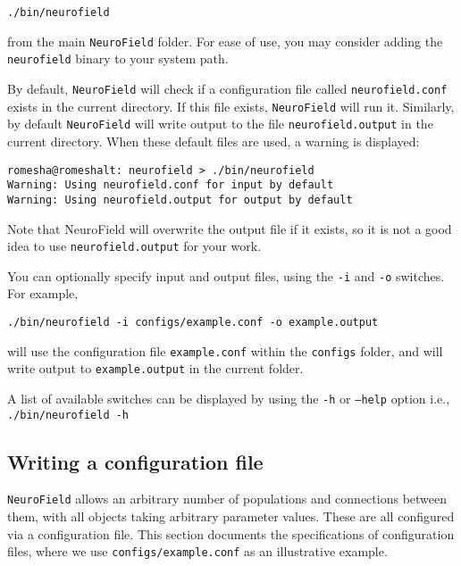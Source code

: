 \documentclass[12pt,a4paper]{article}
\newcommand{\type}[1]{{\small\small\tt #1} }
\newcommand{\NF}[0]{\type{NeuroField}}
\begin{document}
\begin{lstlisting}
./bin/neurofield
\end{lstlisting}

from the main \NF folder. For ease of use, you may consider adding the \type{neurofield} binary to your system path. 

By default, \NF will check if a configuration file called \type{neurofield.conf} exists in the current directory. If this file exists, \NF will run it. Similarly, by default \NF will write output to the file \type{neurofield.output} in the current directory. When these default files are used, a warning is displayed:

\begin{lstlisting}
romesha@romeshalt: neurofield > ./bin/neurofield
Warning: Using neurofield.conf for input by default
Warning: Using neurofield.output for output by default
\end{lstlisting}

Note that NeuroField will overwrite the output file if it exists, so it is not a good idea to use \type{neurofield.output} for your work.

You can optionally specify input and output files, using the \type{-i} and \type{-o} switches. For example,

\begin{lstlisting}
./bin/neurofield -i configs/example.conf -o example.output
\end{lstlisting}

will use the configuration file \type{example.conf} within the \type{configs} folder, and will write output to \type{example.output} in the current folder.

A list of available switches can be displayed by using the \type{-h} or \type{--help} option i.e., \type{./bin/neurofield -h}

\subsection{Writing a configuration file}
\label{sec:config}

\NF allows an arbitrary number of populations and connections between them, with all objects taking arbitrary parameter values. These are all configured via a configuration file. This section documents the specifications of configuration files, where we use \type{configs/example.conf} as an illustrative example.
\end{document}
